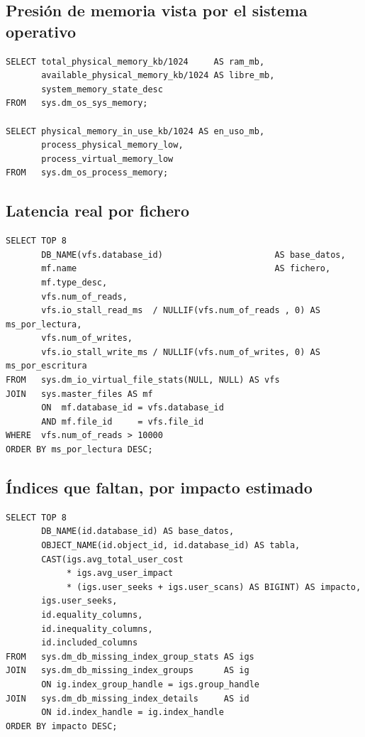 \documentclass[11pt,a4paper]{article}
\begin{document}
\subsection{Presión de memoria vista por el sistema operativo}

\begin{lstlisting}[style=sql]
SELECT total_physical_memory_kb/1024     AS ram_mb,
       available_physical_memory_kb/1024 AS libre_mb,
       system_memory_state_desc
FROM   sys.dm_os_sys_memory;

SELECT physical_memory_in_use_kb/1024 AS en_uso_mb,
       process_physical_memory_low,
       process_virtual_memory_low
FROM   sys.dm_os_process_memory;
\end{lstlisting}

\subsection{Latencia real por fichero}

\begin{lstlisting}[style=sql]
SELECT TOP 8
       DB_NAME(vfs.database_id)                      AS base_datos,
       mf.name                                       AS fichero,
       mf.type_desc,
       vfs.num_of_reads,
       vfs.io_stall_read_ms  / NULLIF(vfs.num_of_reads , 0) AS ms_por_lectura,
       vfs.num_of_writes,
       vfs.io_stall_write_ms / NULLIF(vfs.num_of_writes, 0) AS ms_por_escritura
FROM   sys.dm_io_virtual_file_stats(NULL, NULL) AS vfs
JOIN   sys.master_files AS mf
       ON  mf.database_id = vfs.database_id
       AND mf.file_id     = vfs.file_id
WHERE  vfs.num_of_reads > 10000
ORDER BY ms_por_lectura DESC;
\end{lstlisting}

\subsection{Índices que faltan, por impacto estimado}

\begin{lstlisting}[style=sql]
SELECT TOP 8
       DB_NAME(id.database_id) AS base_datos,
       OBJECT_NAME(id.object_id, id.database_id) AS tabla,
       CAST(igs.avg_total_user_cost
            * igs.avg_user_impact
            * (igs.user_seeks + igs.user_scans) AS BIGINT) AS impacto,
       igs.user_seeks,
       id.equality_columns,
       id.inequality_columns,
       id.included_columns
FROM   sys.dm_db_missing_index_group_stats AS igs
JOIN   sys.dm_db_missing_index_groups      AS ig
       ON ig.index_group_handle = igs.group_handle
JOIN   sys.dm_db_missing_index_details     AS id
       ON id.index_handle = ig.index_handle
ORDER BY impacto DESC;
\end{lstlisting}
\end{document}
